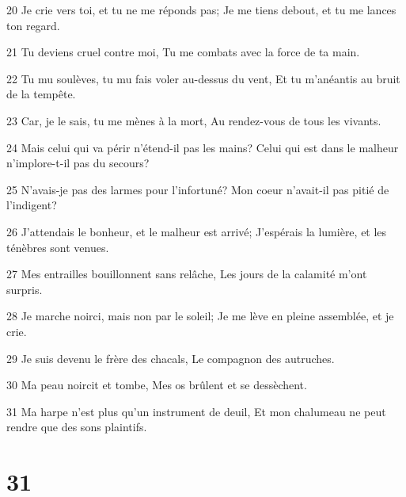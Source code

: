 \par 20 Je crie vers toi, et tu ne me réponds pas; Je me tiens debout, et tu me lances ton regard.
\par 21 Tu deviens cruel contre moi, Tu me combats avec la force de ta main.
\par 22 Tu mu soulèves, tu mu fais voler au-dessus du vent, Et tu m'anéantis au bruit de la tempête.
\par 23 Car, je le sais, tu me mènes à la mort, Au rendez-vous de tous les vivants.
\par 24 Mais celui qui va périr n'étend-il pas les mains? Celui qui est dans le malheur n'implore-t-il pas du secours?
\par 25 N'avais-je pas des larmes pour l'infortuné? Mon coeur n'avait-il pas pitié de l'indigent?
\par 26 J'attendais le bonheur, et le malheur est arrivé; J'espérais la lumière, et les ténèbres sont venues.
\par 27 Mes entrailles bouillonnent sans relâche, Les jours de la calamité m'ont surpris.
\par 28 Je marche noirci, mais non par le soleil; Je me lève en pleine assemblée, et je crie.
\par 29 Je suis devenu le frère des chacals, Le compagnon des autruches.
\par 30 Ma peau noircit et tombe, Mes os brûlent et se dessèchent.
\par 31 Ma harpe n'est plus qu'un instrument de deuil, Et mon chalumeau ne peut rendre que des sons plaintifs.

\chapter{31}

